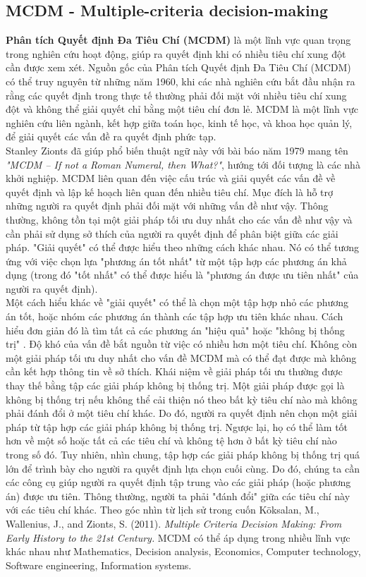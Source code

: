 \subsection{MCDM - Multiple-criteria decision-making }
\textbf{Phân tích Quyết định Đa Tiêu Chí (MCDM)} là một lĩnh vực quan trọng trong nghiên cứu hoạt động, giúp ra quyết định khi có nhiều tiêu chí xung đột cần được xem xét. Nguồn gốc của Phân tích Quyết định Đa Tiêu Chí (MCDM) có thể truy nguyên từ những năm 1960, khi các nhà nghiên cứu bắt đầu nhận ra rằng các quyết định trong thực tế thường phải đối mặt với nhiều tiêu chí xung đột và không thể giải quyết chỉ bằng một tiêu chí đơn lẻ. MCDM là một lĩnh vực nghiên cứu liên ngành, kết hợp giữa toán học, kinh tế học, và khoa học quản lý, để giải quyết các vấn đề ra quyết định phức tạp. \\
Stanley Zionts đã giúp phổ biến thuật ngữ này với bài báo năm 1979 mang tên \textit{"MCDM – If not a Roman Numeral, then What?"}, hướng tới đối tượng là các nhà khởi nghiệp. MCDM liên quan đến việc cấu trúc và giải quyết các vấn đề về quyết định và lập kế hoạch liên quan đến nhiều tiêu chí. Mục đích là hỗ trợ những người ra quyết định phải đối mặt với những vấn đề như vậy. Thông thường, không tồn tại một giải pháp tối ưu duy nhất cho các vấn đề như vậy và cần phải sử dụng sở thích của người ra quyết định để phân biệt giữa các giải pháp. "Giải quyết" có thể được hiểu theo những cách khác nhau. Nó có thể tương ứng với việc chọn lựa "phương án tốt nhất" từ một tập hợp các phương án khả dụng (trong đó "tốt nhất" có thể được hiểu là "phương án được ưu tiên nhất" của người ra quyết định). \\
Một cách hiểu khác về "giải quyết" có thể là chọn một tập hợp nhỏ các phương án tốt, hoặc nhóm các phương án thành các tập hợp ưu tiên khác nhau. Cách hiểu đơn giản đó là tìm tất cả các phương án "hiệu quả" hoặc "không bị thống trị" . Độ khó của vấn đề bắt nguồn từ việc có nhiều hơn một tiêu chí. Không còn một giải pháp tối ưu duy nhất cho vấn đề MCDM mà có thể đạt được mà không cần kết hợp thông tin về sở thích. Khái niệm về giải pháp tối ưu thường được thay thế bằng tập các giải pháp không bị thống trị. Một giải pháp được gọi là không bị thống trị nếu không thể cải thiện nó theo bất kỳ tiêu chí nào mà không phải đánh đổi ở một tiêu chí khác. Do đó, người ra quyết định nên chọn một giải pháp từ tập hợp các giải pháp không bị thống trị. Ngược lại, họ có thể làm tốt hơn về một số hoặc tất cả các tiêu chí và không tệ hơn ở bất kỳ tiêu chí nào trong số đó. Tuy nhiên, nhìn chung, tập hợp các giải pháp không bị thống trị quá lớn để trình bày cho người ra quyết định lựa chọn cuối cùng. Do đó, chúng ta cần các công cụ giúp người ra quyết định tập trung vào các giải pháp (hoặc phương án) được ưu tiên. Thông thường, người ta phải "đánh đổi" giữa các tiêu chí này với các tiêu chí khác. Theo góc nhìn từ lịch sử trong cuốn Köksalan, M., Wallenius, J., and Zionts, S. (2011). \textit{Multiple Criteria Decision Making: From Early History to the 21st Century.} MCDM có thể áp dụng trong nhiều lĩnh vực khác nhau như Mathematics, Decision analysis, Economics, Computer technology, Software engineering, Information systems. 

